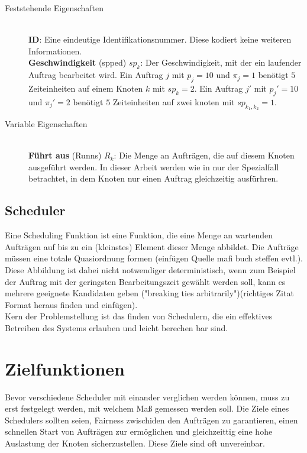 \begin{description}
	\item[Feststehende Eigenschaften] \hfil \\
	\textbf{ID}: Eine eindeutige Identifikationsnummer. Diese kodiert keine weiteren Informationen.\\
	\textbf{Geschwindigkeit} (spped) $sp_k$: Der Geschwindigkeit, mit der ein laufender Auftrag bearbeitet wird. Ein Auftrag $j$ mit $p_j = 10$ und $\pi_j = 1$ benötigt $5$ Zeiteinheiten auf einem Knoten $k$ mit $sp_k = 2$. Ein Auftrag $j'$ mit $p_j' = 10$ und $\pi_j' = 2$ benötigt $5$ Zeiteinheiten auf zwei knoten mit $sp_{k_1, k_2} = 1$.\\
	\item[Variable Eigenschaften] \hfil \\
	\textbf{Führt aus} (Runns) $R_k$: Die Menge an Aufträgen, die auf diesem Knoten ausgeführt werden. In dieser Arbeit werden wie in \cite{Arn99} nur der Spezialfall betrachtet, in dem Knoten nur einen Auftrag gleichzeitig ausfürhren.\\
\end{description}


\subsection{Scheduler}
Eine Scheduling Funktion ist eine Funktion, die eine Menge an wartenden Aufträgen auf bis zu ein (kleinstes) Element dieser Menge abbildet. Die Aufträge müssen eine totale Quasiordnung formen (einfügen Quelle mafi buch steffen evtl.). Diese Abbildung ist dabei nicht notwendiger deterministisch, wenn zum Beispiel der Auftrag mit der geringsten Bearbeitungszeit gewählt werden soll, kann es mehrere geeignete Kandidaten geben ("breaking ties arbitrarily")(richtiges Zitat Format heraus finden und einfügen)\cite{Kar97}.\\
Kern der Problemstellung ist das finden von Schedulern, die ein effektives Betreiben des Systems erlauben und leicht berechen bar sind.

\section{Zielfunktionen}
Bevor verschiedene Scheduler mit einander verglichen werden können, muss zu erst festgelegt werden, mit welchem Maß gemessen werden soll. Die Ziele eines Schedulers sollten seien, Fairness zwischiden den Aufträgen zu garantieren, einen schnellen Start von Aufträgen zur ermöglichen und gleichzeittig eine hohe Auslastung der Knoten sicherzustellen. Diese Ziele sind oft unvereinbar.

